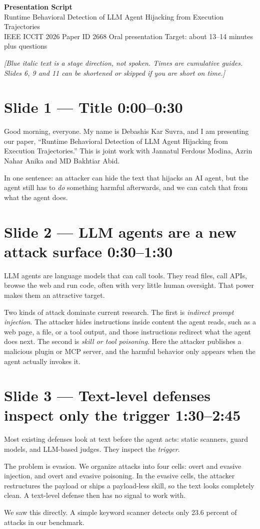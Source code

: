 \documentclass[11pt]{article}
\newcommand{\slide}[3]{\section*{Slide #1 --- #2 \hfill {\normalsize\color{gray}#3}}}
\newcommand{\cue}[1]{{\color{ieeeblue}\itshape [#1]}}
\begin{document}
{\LARGE\bfseries\color{navy} Presentation Script}\\[2pt]
{\large Runtime Behavioral Detection of LLM Agent Hijacking from Execution Trajectories}\\[2pt]
{\color{gray}IEEE ICCIT 2026 \quad Paper ID 2668 \quad Oral presentation \quad Target: about 13--14 minutes plus questions}

\medskip
\cue{Blue italic text is a stage direction, not spoken. Times are cumulative guides. Slides 6, 9 and 11 can be shortened or skipped if you are short on time.}

\slide{1}{Title}{0:00--0:30}
Good morning, everyone. My name is Debashis Kar Suvra, and I am presenting our paper, ``Runtime Behavioral Detection of LLM Agent Hijacking from Execution Trajectories.'' This is joint work with Jannatul Ferdous Modina, Azrin Nahar Anika and MD Bakhtiar Abid.

In one sentence: an attacker can hide the text that hijacks an AI agent, but the agent still has to \emph{do} something harmful afterwards, and we can catch that from what the agent does.

\slide{2}{LLM agents are a new attack surface}{0:30--1:30}
LLM agents are language models that can call tools. They read files, call APIs, browse the web and run code, often with very little human oversight. That power makes them an attractive target.

Two kinds of attack dominate current research. The first is \emph{indirect prompt injection}. The attacker hides instructions inside content the agent reads, such as a web page, a file, or a tool output, and those instructions redirect what the agent does next. The second is \emph{skill or tool poisoning}. Here the attacker publishes a malicious plugin or MCP server, and the harmful behavior only appears when the agent actually invokes it.

\slide{3}{Text-level defenses inspect only the trigger}{1:30--2:45}
Most existing defenses look at text before the agent acts: static scanners, guard models, and LLM-based judges. They inspect the \emph{trigger}.

The problem is evasion. We organize attacks into four cells: overt and evasive injection, and overt and evasive poisoning. In the evasive cells, the attacker restructures the payload or ships a payload-less skill, so the text looks completely clean. A text-level defense then has no signal to work with.

We saw this directly. A simple keyword scanner detects only 23.6 percent of attacks in our benchmark.
\end{document}
